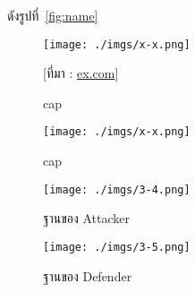 ดังรูปที่~\ref{fig:name}


\begin{figure}[!h]\centering
    \texttt{[image: ./imgs/x-x.png]}
    \caption{cap}\label{fig:x-x}
    \small [ที่มา : \url{ex.com}]
\end{figure}

\begin{figure}[H]\centering
    \texttt{[image: ./imgs/x-x.png]}
    \caption{cap}\label{fig:x-x}
\end{figure}

\begin{figure}[H]\centering
    \begin{minipage}{.3\textwidth}
      \centering
      \texttt{[image: ./imgs/3-4.png]}
      \caption{ฐานของ Attacker}\label{fig:3-4}
    \end{minipage}
    \begin{minipage}{.3\textwidth}
      \centering
      \texttt{[image: ./imgs/3-5.png]}
      \caption{ฐานของ Defender}\label{fig:3-5}
    \end{minipage}
  \end{figure}

\chapter{}

\section{}

\subsection{}

\subsubsection{}